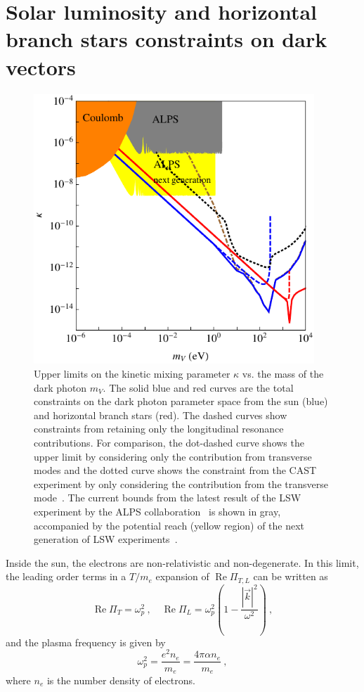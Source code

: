 \documentclass[12pt]{article}
\DeclareMathOperator{\real}{Re}
\begin{document}
\section{Solar luminosity and horizontal branch stars constraints on dark vectors}

\begin{figure}
\centering
\includegraphics[height=4in]{plotall.pdf}
\caption{Upper limits on the kinetic mixing parameter $\kappa$ vs.
  the mass of the dark photon $m_V$. The solid blue and red curves are
  the total constraints on the dark photon parameter space from the
  sun (blue) and horizontal branch stars (red).  The dashed curves show constraints
  from retaining only the longitudinal resonance contributions.  For
  comparison, the dot-dashed curve shows the upper limit by
  considering only the contribution from transverse modes and the dotted curve shows the constraint from the CAST experiment by only considering the contribution from the transverse mode~\cite{Redondo:2008aa}. The current
  bounds from the latest result of the LSW experiment by the ALPS
  collaboration~\cite{Ehret:2010mh} is shown in gray, accompanied by
  the potential reach (yellow region) of the next generation of LSW
  experiments~\cite{Redondo:2010dp}. }\label{fig:full}
\end{figure}

Inside the sun, the electrons are non-relativistic and
non-degenerate. In this limit, the leading order terms in a $T/m_e$
expansion of $\real \Pi_{T,L}$ can be written as
\begin{equation}
\real \Pi_{T} = \omega_{p}^{2} \ , \quad
\real\Pi_{L} = \omega_{p}^{2} \left(1 - \frac{|\vec k|^{2}}{\omega^{2}}\right) \ ,
\end{equation}
and the plasma frequency is given by
\begin{equation}
\omega_p^2 =\frac{e^2 n_e}{m_e} =\frac{4\pi \alpha n_e}{m_e} \ ,
\end{equation}
where $n_e$ is the number density of electrons. 
\end{document}
